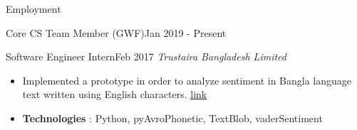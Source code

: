\documentclass[]{mcdowellcv}
\begin{document}
\begin{cvsection}{Employment}
\begin{cvsubsection}{Core CS Team Member (GWF)}{}{Jan 2019 - Present}
\begin{itemize}
    	    \end{itemize}
    	
        \end{cvsubsection}
	
    	\begin{cvsubsection}{Software Engineer Intern}{}{Feb 2017}
    	\emph{Trustaira Bangladesh Limited}
    	    \begin{itemize}
    	        \item Implemented a prototype in order to analyze sentiment in Bangla language text written using English characters. \href{https://techfoxweb.wordpress.com/2017/07/24/banglish-sentiment-analysis/}{ \underline{link}}
    	        \item \textbf{Technologies} : Python, pyAvroPhonetic, TextBlob, vaderSentiment 
    	        
    	    \end{itemize}
    	
    	\end{cvsubsection}
    	
    
        
    	        
    	
	
	
	
	\end{cvsection}
	
\end{document}
